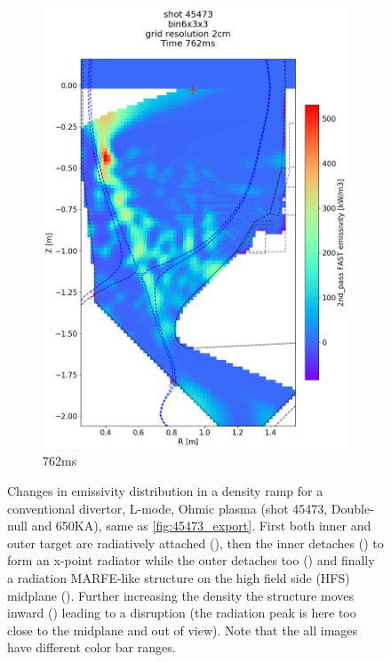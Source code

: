 \begin{figure}
\begin{subfigure}{0.395\linewidth}
         \includegraphics[trim={5 90 0 190},clip,width=\textwidth]{Chapters/chapter2/figs/IRVB-MASTU_shot-45473_export_76.png}
         \vspace*{-6.5mm}
         \caption{762ms}
         \label{fig:45473_export2_5}
     \end{subfigure}
    \vspace*{-3mm}
    \caption{Changes in emissivity distribution in a density ramp for a conventional divertor, L-mode, Ohmic plasma (shot 45473, Double-null and 650KA), same as \autoref{fig:45473_export}. First both inner and outer target are radiatively attached (), then the inner detaches () to form an x-point radiator while the outer detaches too () and finally a radiation MARFE-like structure on the high field side (HFS) midplane (). Further increasing the density the structure moves inward () leading to a disruption (the radiation peak is here too close to the midplane and out of view). Note that the all images have different color bar ranges.}
    \label{fig:45473_export2}
\end{figure}
